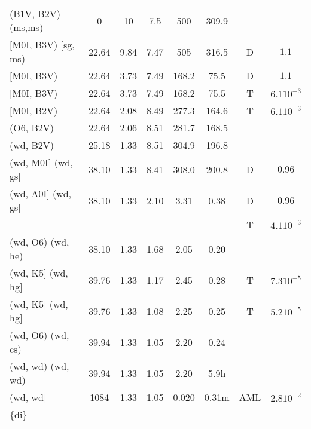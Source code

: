 \documentclass{article}
\begin{document}
\begin{table}
\begin{tabular}{p{4cm}ccccccc}
\hline
(B1V, B2V) (ms,ms)	& 0	& 10	& 7.5	& 500	& 309.9	&	&			\\
$[$M0I, B3V) $[$sg, ms)	& 22.64	& 9.84	& 7.47	& 505	& 316.5	& D	& $1.1$			\\
$[$M0I, B3V)	 	& 22.64	& 3.73	& 7.49	& 168.2	& 75.5	& D     & $1.1$	 		\\
$[$M0I, B3V)	 	& 22.64	& 3.73	& 7.49	& 168.2	& 75.5	& T     & $6.1 10^{-3}$		\\
$[$M0I, B2V)	 	& 22.64	& 2.08	& 8.49	& 277.3	& 164.6	& T     & $6.1 10^{-3}$		\\
(O6, B2V)	 	& 22.64	& 2.06	& 8.51	& 281.7	& 168.5	& 	& 			\\
(wd, B2V)	 	& 25.18	& 1.33	& 8.51	& 304.9	& 196.8	&	&			\\
(wd, M0I$]$ (wd, gs$]$	& 38.10	& 1.33	& 8.41	& 308.0	& 200.8	& D	& $0.96$	        \\
(wd, A0I$]$ (wd, gs$]$	& 38.10	& 1.33	& 2.10	& 3.31 	& 0.38	& D	& $0.96$	        \\
                        &       &       &       &       &       & T	& $4.1 10^{-3}$		\\
(wd, O6) (wd, he)	& 38.10	& 1.33	& 1.68	& 2.05 	& 0.20	& 	&                       \\
(wd, K5$]$ (wd, hg$]$  	& 39.76	& 1.33 	& 1.17	& 2.45 	& 0.28 	& T     & $7.3 10^{-5}$	        \\
(wd, K5$]$ (wd, hg$]$  	& 39.76	& 1.33 	& 1.08	& 2.25 	& 0.25 	& T     & $5.2 10^{-5}$	        \\
(wd, O6) (wd, cs)	& 39.94	& 1.33	& 1.05	& 2.20	& 0.24	& 	&                       \\
(wd, wd) (wd, wd)	& 39.94	& 1.33	& 1.05	& 2.20	& 5.9h	& 	&                       \\
(wd, wd$]$       	& 1084 	& 1.33	& 1.05	& 0.020	& 0.31m	& AML	& $2.8 10^{-2}$	        \\
\{di\}     	        & \\
\hline
\end{tabular}
\end{table}
\end{document}
